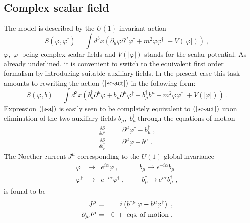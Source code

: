 \documentclass[a4paper,12pt]{article}
\begin{document}
\subsection{Complex scalar field}
The model is described by the $U(1)$ invariant action
\begin{equation}
S(\varphi ,\varphi ^{\dagger })=\int d^3x\left( \partial _\mu \varphi
\partial ^\mu \varphi ^{\dagger }+m^2\varphi \varphi ^{\dagger }\;+V(\left|
\varphi \right| )\right) \;,  \label{sc-act}
\end{equation}
$\varphi ,\;\varphi ^{\dagger }\;$being complex scalar fields and $V(\left| \varphi \right| )$
stands for the scalar potential. As already underlined, it is
convenient to switch to the equivalent first order formalism by
introducing suitable auxiliary fields. In the present case this task
amounts to rewriting the action $\left( {\rm {\ref{sc-act}}}\right) $
in the following form:
\begin{equation}
S(\varphi ,b)=\int d^3x\left( b_\mu ^{\dagger }\partial ^\mu \varphi +b_\mu
\partial ^\mu \varphi ^{\dagger }-b_\mu ^{\dagger }b^\mu +m^2\varphi \varphi
^{\dagger }\;+V(\left| \varphi \right| )\right) \;.  \label{s-a}
\end{equation}
Expression $\left( {\rm {\ref{s-a}}}\right) $ is easily seen to be
completely equivalent to $\left( {\rm {\ref{sc-act}}}\right) $ upon
elimination of the two auxiliary fields $b_\mu ,\;b_\mu ^{\dagger }$
through the equations of motion
\begin{eqnarray}
\frac{\delta S}{\delta b^\mu } &=&\partial ^\mu \varphi ^{\dagger }-b_\mu^{\dagger }\;,  \label{eq-m} \\
\frac{\delta S}{\delta b_\mu ^{\dagger }} &=&\partial ^\mu \varphi -b^\mu \;.
\nonumber
\end{eqnarray}
The Noether current $J^\mu $ corresponding to the $U(1)$ global
invariance
\begin{eqnarray}
\varphi &\to &e^{i\alpha }\varphi \;,\;\;\;\;\;\;\;\;\;\;\;b_\mu
\to e^{-i\alpha }b_\mu \;  \label{u1-inv} \\
\varphi ^{\dagger } &\to &e^{-i\alpha }\varphi ^{\dagger
}\;,\;\;\;\;\;\;\;\;\;b_\mu ^{\dagger }\to e^{i\alpha }b_\mu
^{\dagger }\;,  \nonumber
\end{eqnarray}
is found to be
\begin{eqnarray}
J^\mu &=&i\left( b^{\dagger \mu }\;\varphi -b^\mu \varphi ^{\dagger
}\right) \;,  \label{u1-sc} \\
\partial _\mu J^\mu &=&0\;+\;{\rm eqs.\;of\;motion\;.}  \nonumber
\end{eqnarray}
\end{document}
